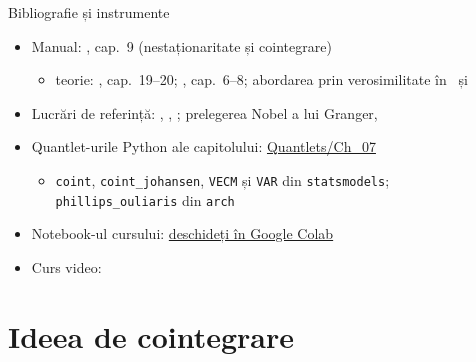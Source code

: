 \begin{frame}{Bibliografie și instrumente}
\itemsize{\small}
\begin{itemize}
    \item Manual: , cap.~9 (nestaționaritate și cointegrare)
    \begin{itemize}
        \item teorie: , cap.~19--20; , cap.~6--8; abordarea prin verosimilitate în \ și 
    \end{itemize}
    \item Lucrări de referință: , , ; prelegerea Nobel a lui Granger, 
    \item Quantlet-urile Python ale capitolului: \href{https://github.com/danpele/Time-Series-Analysis/tree/main/Quantlets/Ch_07}{Quantlets/Ch\_07}
    \begin{itemize}
        \item \texttt{coint}, \texttt{coint\_johansen}, \texttt{VECM} și \texttt{VAR} din \texttt{statsmodels}; \texttt{phillips\_ouliaris} din \texttt{arch}
    \end{itemize}
    \item Notebook-ul cursului: \href{\colaburl{notebooks/EN/chapter7_lecture_notebook.ipynb}}{deschideți în Google Colab}
    \item Curs video: 
\end{itemize}
\end{frame}


\section{Ideea de cointegrare}

